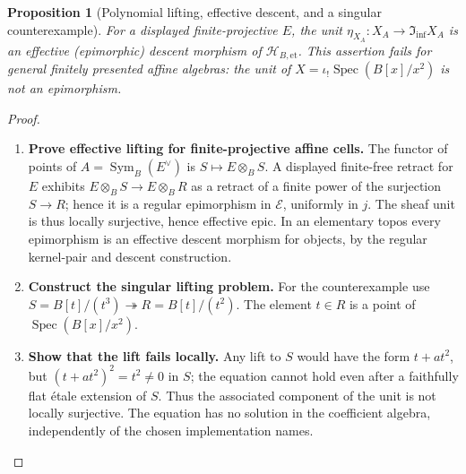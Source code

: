 \documentclass[11pt,a4paper]{article}
\numberwithin{algorithm}{section}
\numberwithin{equation}{section}
\newtheorem{proposition}[proposition]{Proposition}
\theoremstyle{definition}
\theoremstyle{remark}
\theoremstyle{plain}
\newcommand{\E}{\mathcal E}
\newcommand{\Sym}{\operatorname{Sym}}
\newcommand{\InfShape}{\mathfrak I_{\mathrm{inf}}}
\newcommand{\ThickEt}{\mathscr H_{B,\mathrm{et}}}
\theoremstyle{definition}
\theoremstyle{plain}
\begin{document}
\begin{proposition}[Polynomial lifting, effective descent, and a singular counterexample]
\label{prop:shape-lifting-scope}
For a displayed finite-projective $E$, the unit
$\eta_{X_A}:X_A\to\InfShape X_A$ is an effective
(epimorphic) descent morphism of $\ThickEt$.  This
assertion fails for general finitely presented affine
algebras: the unit of
$X=\iota_!\operatorname{Spec}(B[x]/x^2)$ is not an
epimorphism.
\end{proposition}
\begin{proof}\leavevmode
\begin{enumerate}[leftmargin=*,align=left]
\item \textbf{Prove effective lifting for finite-projective affine cells.}
The functor of points of $A=\Sym_B(E^\vee)$ is
$S\mapsto E\otimes_BS$.  A displayed finite-free retract
for $E$ exhibits
$E\otimes_BS\to E\otimes_BR$ as a retract
of a finite power of the surjection $S\to R$; hence it
is a regular epimorphism in $\E$, uniformly in $j$.
The sheaf unit is thus locally surjective, hence effective
epic.  In an elementary topos every epimorphism is an
effective descent morphism for objects, by the regular
kernel-pair and descent construction.

\item \textbf{Construct the singular lifting problem.}
For the counterexample use
$S=B[t]/(t^3)\twoheadrightarrow R=B[t]/(t^2)$.
The element $t\in R$ is a point of $\operatorname{Spec}(B[x]/x^2)$.

\item \textbf{Show that the lift fails locally.}
Any lift to $S$ would have the form $t+at^2$, but
$(t+at^2)^2=t^2\ne0$ in $S$; the equation cannot hold
even after a faithfully flat \'etale extension of $S$.
Thus the associated component of the unit is not locally
surjective.  The equation has no solution in the coefficient algebra, independently
of the chosen implementation names.
\end{enumerate}
\end{proof}
\end{document}
